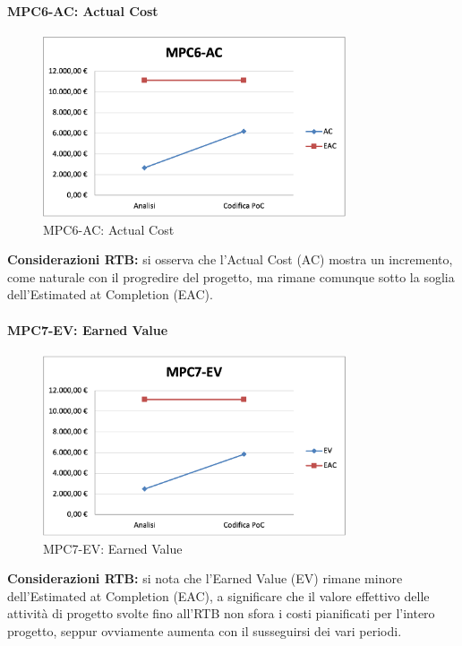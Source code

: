 \paragraph{MPC6-AC: Actual Cost}
\begin{figure}[h!] 
    \centering
    \includegraphics[width=0.8\textwidth]{images/MPC6-AC.png}
    \caption{MPC6-AC: Actual Cost}
\end{figure}
\noindent \textbf{Considerazioni RTB:} si osserva che l’Actual Cost (AC) mostra un incremento, come naturale con il progredire del progetto, ma rimane comunque sotto la soglia dell'Estimated at Completion (EAC). 

\paragraph{MPC7-EV: Earned Value}
\begin{figure}[h!] 
    \centering
    \includegraphics[width=0.8\textwidth]{images/MPC7-EV.png}
    \caption{MPC7-EV: Earned Value}
\end{figure}
\noindent \textbf{Considerazioni RTB:} si nota che l'Earned Value (EV) rimane minore dell'Estimated at Completion (EAC), a significare che il valore effettivo delle attività di progetto svolte fino all'RTB non sfora i costi pianificati per l'intero progetto, seppur ovviamente aumenta con il susseguirsi dei vari periodi.

